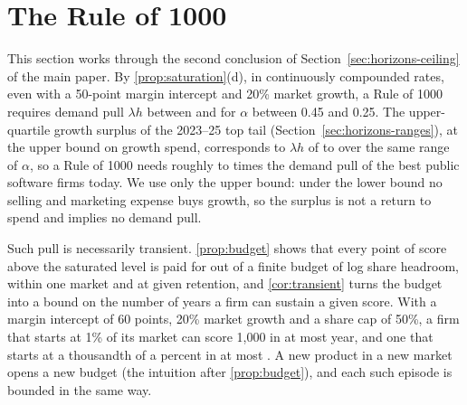 \section{The Rule of 1000}\label{supp:rule1000}
This section works through the second conclusion of Section~\ref{sec:horizons-ceiling} of the main paper. By \autoref{prop:saturation}(d), in continuously compounded rates, even with a 50-point margin intercept and 20\% market growth, a Rule of 1000 requires demand pull $\lambda h$ between \LamThouLo{} and \LamThouHi{} for $\alpha$ between 0.45 and 0.25. The upper-quartile growth surplus of the 2023--25 top tail (Section~\ref{sec:horizons-ranges}), at the upper bound on growth spend, corresponds to $\lambda h$ of \LamPiLo{} to \LamPiHi{} over the same range of $\alpha$, so a Rule of 1000 needs roughly \PullMultLo{} to \PullMultHi{} times the demand pull of the best public software firms today. We use only the upper bound: under the lower bound no selling and marketing expense buys growth, so the surplus is not a return to spend and implies no demand pull.

Such pull is necessarily transient. \autoref{prop:budget} shows that every point of score above the saturated level is paid for out of a finite budget of log share headroom, within one market and at given retention, and \autoref{cor:transient} turns the budget into a bound on the number of years a firm can sustain a given score. With a margin intercept of 60 points, 20\% market growth and a share cap of 50\%, a firm that starts at 1\% of its market can score 1{,}000 in at most \TransOnePct{} year, and one that starts at a thousandth of a percent in at most \TransSmall. A new product in a new market opens a new budget (the intuition after \autoref{prop:budget}), and each such episode is bounded in the same way.
